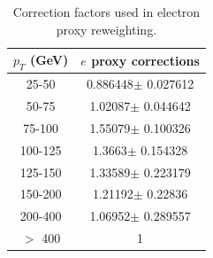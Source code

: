 \begin{table}[htdp]
	\centering
  \begin{tabular}{|c|c|}
  \hline
  $p_T$ (GeV)  & $e$ proxy corrections \\ \hline
  25-50  & 0.886448$\pm$ 0.027612  \\ \hline
  50-75  & 1.02087$\pm$ 0.044642  \\ \hline
  75-100  & 1.55079$\pm$ 0.100326  \\ \hline
  100-125  & 1.3663$\pm$ 0.154328  \\ \hline
  125-150  & 1.33589$\pm$ 0.223179  \\ \hline
  150-200  & 1.21192$\pm$ 0.22836  \\ \hline
  200-400  & 1.06952$\pm$ 0.289557  \\ \hline
  $>$ 400 & 1 \\ \hline
  \end{tabular}
  \caption{Correction factors used in electron proxy reweighting.}
  \label{table:correctionsfakelep}
\end{table}
